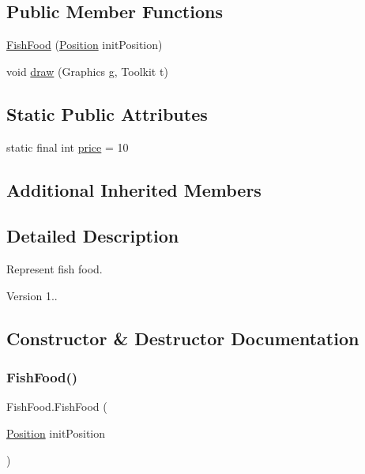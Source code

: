 \subsection*{Public Member Functions}
\begin{DoxyCompactItemize}
\item 
\mbox{\hyperlink{class_fish_food_a5dd9ac8ea43f95666cc95b22714e9f1c}{Fish\+Food}} (\mbox{\hyperlink{class_position}{Position}} init\+Position)
\item 
void \mbox{\hyperlink{class_fish_food_a061d353336adc633607668e8d8a73b25}{draw}} (Graphics g, Toolkit t)
\end{DoxyCompactItemize}
\subsection*{Static Public Attributes}
\begin{DoxyCompactItemize}
\item 
static final int \mbox{\hyperlink{class_fish_food_a3b3d22ebf237fb5fb445e1d8b233a777}{price}} = 10
\end{DoxyCompactItemize}
\subsection*{Additional Inherited Members}


\subsection{Detailed Description}
Represent fish food. \begin{DoxyVersion}{Version}
1.. 
\end{DoxyVersion}


\subsection{Constructor \& Destructor Documentation}
\mbox{\label{class_fish_food_a5dd9ac8ea43f95666cc95b22714e9f1c}} 
\subsubsection{\texorpdfstring{Fish\+Food()}{FishFood()}}
{\footnotesize\ttfamily Fish\+Food.\+Fish\+Food (\begin{DoxyParamCaption}\item[{\mbox{\hyperlink{class_position}{Position}}}]{init\+Position }\end{DoxyParamCaption})\hspace{0.3cm}{\ttfamily [inline]}}

